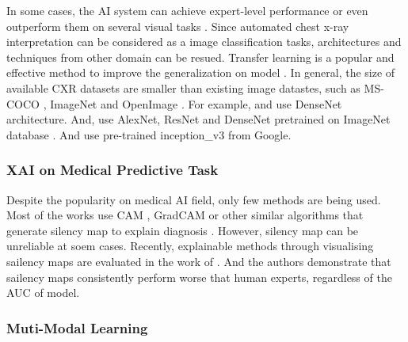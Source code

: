 In some cases, the AI system can achieve expert-level performance or even outperform them on several visual tasks \citep{Rajpurkar2017CheXNet, Yuan2020DAM, Tang2020AbnormalityCXRCNN}.  Since automated chest x-ray interpretation can be considered as a image classification tasks, architectures and techniques from other domain can be resued. Transfer learning is a popular and effective method to improve the generalization on model \citep{Zhuang2019TransferLearningSurvey}. In general, the size of available CXR datasets are smaller than existing image datastes, such as MS-COCO \citep{Lin2014MSCOCO}, ImageNet \citep{Deng2009ImageNet} and OpenImage \citep{Kuznetsova2020OpenImages}. For example, \citet{Yuan2020DAM} and \citet{Cohen2020Covid19} use DenseNet\citep{Huang2016DenseNet} architecture. And, \citet{Dunnmon2019CNNOnCXRAssessment} use AlexNet\citep{Alex2012AlexNet}, ResNet \citep{He2015ResNet} and DenseNet pretrained on ImageNet database \citep{Deng2009ImageNet}. And \citet{Yates2018RedDotCXR} use pre-trained inception_v3\citep{Szegedy2015InceptionV3} from Google.

\subsubsection{XAI on Medical Predictive Task}


Despite the popularity on medical AI field, only few methods are being used. Most of the works use CAM \citep{Zhou2015CAM}, GradCAM\citep{Selvaraju2017GradCAM} or other similar algorithms that generate silency map to explain diagnosis \citep{Teixeira2021LIMEAndGradCAMOnCXR, Rajpurkar2018CheXNeXt, Rajpurkar2017CheXNet, Brunese2020ExplainableCovid19, Hou2021ExplainableCovid19}. However, silency map can be unreliable at soem cases. Recently, explainable methods through visualising sailency maps are evaluated in the work of \citep{Saporta2021BechmarkingSaliencyMethods}. And the authors demonstrate that sailency maps consistently perform worse that human experts, regardless of the AUC of model.

\subsubsection{Muti-Modal Learning}




